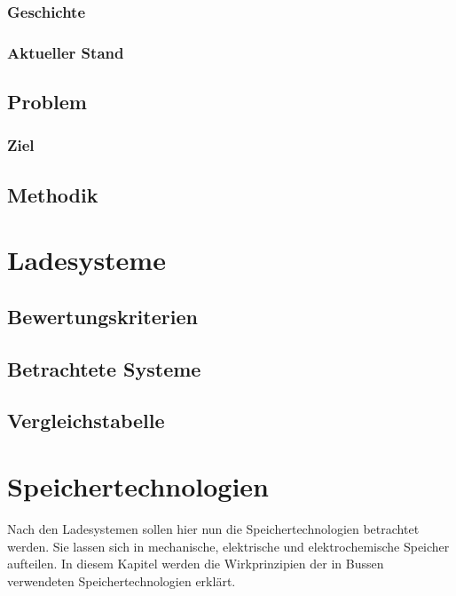 \documentclass[twoside]{scrreprt}
\begin{document}
\subsection{Geschichte}
\subsection{Aktueller Stand}
\section{Problem}
\subsection{Ziel} %
\section{Methodik} %

\chapter{Ladesysteme} %
\section{Bewertungskriterien} %
\section{Betrachtete Systeme} %
\section{Vergleichstabelle}

\chapter{Speichertechnologien} %
Nach den Ladesystemen sollen hier nun die Speichertechnologien betrachtet werden. Sie lassen sich in mechanische, elektrische und elektrochemische Speicher aufteilen. In diesem Kapitel werden die Wirkprinzipien der in Bussen verwendeten Speichertechnologien erklärt.\\
\end{document}

